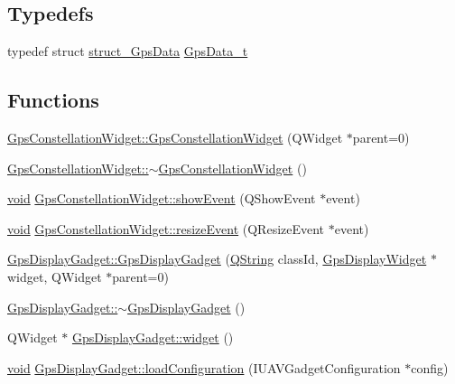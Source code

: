 \subsection*{\-Typedefs}
\begin{DoxyCompactItemize}
\item 
typedef struct \hyperlink{structstruct___gps_data}{struct\-\_\-\-Gps\-Data} \hyperlink{group___g_p_s_gadget_plugin_ga4f1b5520a42a0033fb4d09fc7cbc2197}{\-Gps\-Data\-\_\-t}
\end{DoxyCompactItemize}
\subsection*{\-Functions}
\begin{DoxyCompactItemize}
\item 
\hyperlink{group___g_p_s_gadget_plugin_gaa8d0d3435153893cbf167a1e5820d979}{\-Gps\-Constellation\-Widget\-::\-Gps\-Constellation\-Widget} (\-Q\-Widget $\ast$parent=0)
\item 
\hyperlink{group___g_p_s_gadget_plugin_gaa4c124f26c71bf318147e079011fe137}{\-Gps\-Constellation\-Widget\-::$\sim$\-Gps\-Constellation\-Widget} ()
\item 
\hyperlink{group___u_a_v_objects_plugin_ga444cf2ff3f0ecbe028adce838d373f5c}{void} \hyperlink{group___g_p_s_gadget_plugin_ga6b206d00a88aa90134aba5ca815355a9}{\-Gps\-Constellation\-Widget\-::show\-Event} (\-Q\-Show\-Event $\ast$event)
\item 
\hyperlink{group___u_a_v_objects_plugin_ga444cf2ff3f0ecbe028adce838d373f5c}{void} \hyperlink{group___g_p_s_gadget_plugin_ga33f2f0f0eba2737a2917b206fda14a11}{\-Gps\-Constellation\-Widget\-::resize\-Event} (\-Q\-Resize\-Event $\ast$event)
\item 
\hyperlink{group___g_p_s_gadget_plugin_ga748699eae5b29ee0958be37c23a348f8}{\-Gps\-Display\-Gadget\-::\-Gps\-Display\-Gadget} (\hyperlink{group___u_a_v_objects_plugin_gab9d252f49c333c94a72f97ce3105a32d}{\-Q\-String} class\-Id, \hyperlink{class_gps_display_widget}{\-Gps\-Display\-Widget} $\ast$widget, \-Q\-Widget $\ast$parent=0)
\item 
\hyperlink{group___g_p_s_gadget_plugin_ga6ec785be3eefba596601b671573f6401}{\-Gps\-Display\-Gadget\-::$\sim$\-Gps\-Display\-Gadget} ()
\item 
\-Q\-Widget $\ast$ \hyperlink{group___g_p_s_gadget_plugin_ga343958b41e6a9deb4720c9b3098396c2}{\-Gps\-Display\-Gadget\-::widget} ()
\item 
\hyperlink{group___u_a_v_objects_plugin_ga444cf2ff3f0ecbe028adce838d373f5c}{void} \hyperlink{group___g_p_s_gadget_plugin_gace7e777ca2b6d35514b22ec3b8d9f7c5}{\-Gps\-Display\-Gadget\-::load\-Configuration} (\-I\-U\-A\-V\-Gadget\-Configuration $\ast$config)

\end{DoxyCompactItemize}
